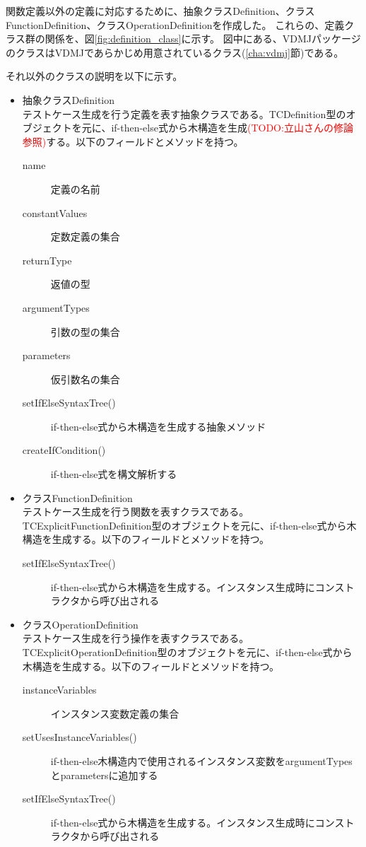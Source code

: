 \documentclass[uplatex, report, a4j, 10pt]{jsbook}
\newcommand\todo[1]{\textcolor{red}{#1}}
\begin{document}
関数定義以外の定義に対応するために、抽象クラスDefinition、クラスFunctionDefinition、クラスOperationDefinitionを作成した。
これらの、定義クラス群の関係を、図\ref{fig:definition_class}に示す。
図中にある、VDMJパッケージのクラスはVDMJであらかじめ用意されているクラス(\ref{cha:vdmj}節)である。

それ以外のクラスの説明を以下に示す。

\begin{itemize}
  \item 抽象クラスDefinition\\
        テストケース生成を行う定義を表す抽象クラスである。TCDefinition型のオブジェクトを元に、if-then-else式から木構造を生成\todo{(TODO:立山さんの修論参照)}する。以下のフィールドとメソッドを持つ。
        \begin{description}
          \item[name] 定義の名前
          \item[constantValues] 定数定義の集合
          \item[returnType] 返値の型
          \item[argumentTypes] 引数の型の集合
          \item[parameters] 仮引数名の集合
          \item[setIfElseSyntaxTree()] if-then-else式から木構造を生成する抽象メソッド
          \item[createIfCondition()] if-then-else式を構文解析する
        \end{description}

  \item クラスFunctionDefinition\\
        テストケース生成を行う関数を表すクラスである。TCExplicitFunctionDefinition型のオブジェクトを元に、if-then-else式から木構造を生成する。以下のフィールドとメソッドを持つ。
        \begin{description}
          \item[setIfElseSyntaxTree()] if-then-else式から木構造を生成する。インスタンス生成時にコンストラクタから呼び出される
        \end{description}

  \item クラスOperationDefinition\\
        テストケース生成を行う操作を表すクラスである。TCExplicitOperationDefinition型のオブジェクトを元に、if-then-else式から木構造を生成する。以下のフィールドとメソッドを持つ。
        \begin{description}
          \item[instanceVariables] インスタンス変数定義の集合
          \item[setUsesInstanceVariables()] if-then-else木構造内で使用されるインスタンス変数をargumentTypesとparametersに追加する
          \item[setIfElseSyntaxTree()] if-then-else式から木構造を生成する。インスタンス生成時にコンストラクタから呼び出される
        \end{description}


\end{itemize}
\end{document}
